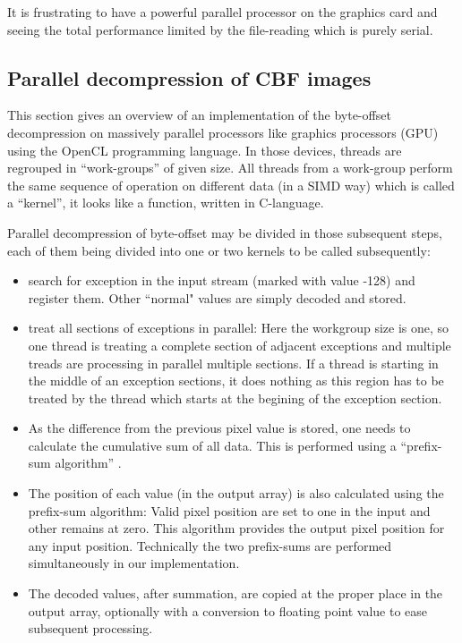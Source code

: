 \documentclass[preprint]{iucr}              %
\begin{document}
It is frustrating to have a powerful parallel processor on the
graphics card and seeing the total performance limited by the file-reading
which is purely serial.

\subsection{Parallel decompression of CBF images}
 
This section gives an overview of an implementation of the byte-offset
decompression on massively parallel processors like graphics processors
(GPU) using the OpenCL \cite{opencl} programming language.
In those devices, threads are regrouped in ``work-groups'' of given size. 
All threads from a work-group perform the same sequence of operation on
different data (in a SIMD way) which is called a ``kernel'', it looks like a
function, written in C-language.

Parallel decompression of byte-offset may be divided in those subsequent steps,
each of them being divided into one or two kernels to be called subsequently:
\begin{itemize}
  \item search for exception in the input stream (marked with value -128) and
  register them. Other ``normal" values are simply decoded and stored.
  \item treat all sections of exceptions in parallel: Here the workgroup size is
  one, so one thread is treating a complete section of adjacent exceptions
  and multiple treads are processing in parallel multiple sections. If a thread
  is starting in the middle of an exception sections, it does nothing as this
  region has to be treated by the thread which starts at the begining of the 
  exception section.
  \item As the difference from the previous pixel value is stored, one needs to
  calculate the cumulative sum of all data. This is performed using a
  ``prefix-sum algorithm'' \cite{scan}.
  \item The position of each value (in the output array) is also calculated
  using the prefix-sum algorithm: Valid pixel position are set to one in the
  input and other remains at zero. This algorithm provides the output pixel
  position for any input position.
  Technically the two prefix-sums are performed simultaneously in our
  implementation.
  \item The decoded values, after summation, are copied at the proper place in
  the output array, optionally with a conversion to floating point value to
  ease subsequent processing.
\end{itemize} 
\end{document}
